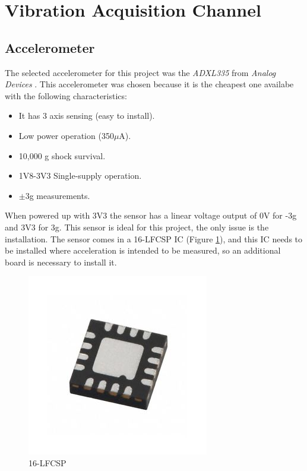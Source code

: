 \section{Vibration Acquisition Channel}\label{sec:vibration-acquisition-channel}

\subsection{Accelerometer}\label{ssec:accelerometer-signal}
	The selected accelerometer for this project was the \textit{ADXL335} from \textit{Analog Devices} \cite{devices2010adxl335}. This accelerometer was chosen because it is the cheapest one availabe with the following characteristics:

	\begin{itemize}
		\item It has 3 axis sensing (easy to install).
		\item Low power operation (350$\mu$A).
		\item 10,000 g shock survival.
		\item 1V8-3V3 Single-supply operation.
		\item $\pm$3g measurements.
	\end{itemize}

	When powered up with 3V3 the sensor has a linear voltage output of 0V for -3g and 3V3 for 3g. This sensor is ideal for this project, the only issue is the installation. The sensor comes in a 16-LFCSP IC (Figure \ref{fig:16lfcsp}), and this IC needs to be installed where acceleration is intended to be measured, so an additional board is necessary to install it. 

	\begin{figure}[htbp]
		\centering
		\includegraphics[width=.5\textwidth]{figuras/fig-16lfcsp.jpg}
		\caption{16-LFCSP \cite{16lfcsp}}
		\label{fig:16lfcsp}
	\end{figure}

